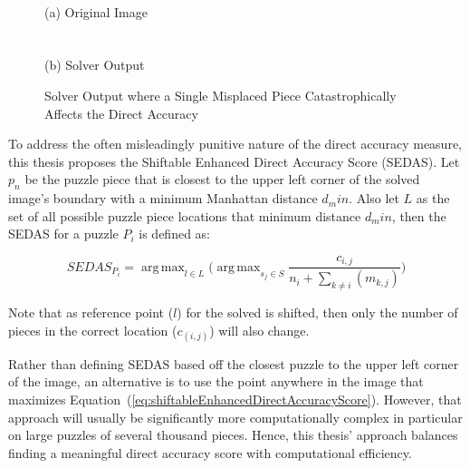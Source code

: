 \documentclass{report}
\def\eref#1{(\ref{#1})}
\DeclareMathOperator*{\argmax}{arg\,max} %
\begin{document}
\begin{figure}
\centering
{}
\\
(a) Original Image
\\ ~\\
\\
(b) Solver Output
\caption{Solver Output where a Single Misplaced Piece Catastrophically Affects the Direct Accuracy}
\label{fig:directAccuracyOnePieceEffect}
\end{figure}

To address the often misleadingly punitive nature of the direct accuracy measure, this thesis proposes the Shiftable Enhanced Direct Accuracy Score (SEDAS).  Let $p_n$ be the puzzle piece that is closest to the upper left corner of the solved image's boundary with a minimum Manhattan distance $d_min$.  Also let $L$ as the set of all possible puzzle piece locations that minimum distance $d_min$, then the SEDAS for a puzzle $P_i$ is defined as:

\begin{equation} \label{eq:shiftableEnhancedDirectAccuracyScore}
SEDAS_{P_i} = \argmax_{l \in L} \Big( \argmax_{s_j \in S}\frac{c_{i,j}}{n_i + \sum_{k \ne i}(m_{k,j})} \Big)
\end{equation}

Note that as reference point ($l$) for the solved is shifted, then only the number of pieces in the correct location ($c_(i,j)$) will also change.  

Rather than defining SEDAS based off the closest puzzle to the upper left corner of the image, an alternative is to use the point anywhere in the image that maximizes Equation~\eref{eq:shiftableEnhancedDirectAccuracyScore}.  However, that approach will usually be significantly more computationally complex in particular on large puzzles of several thousand pieces.  Hence, this thesis' approach balances finding a meaningful direct accuracy score with computational efficiency.
\end{document}
